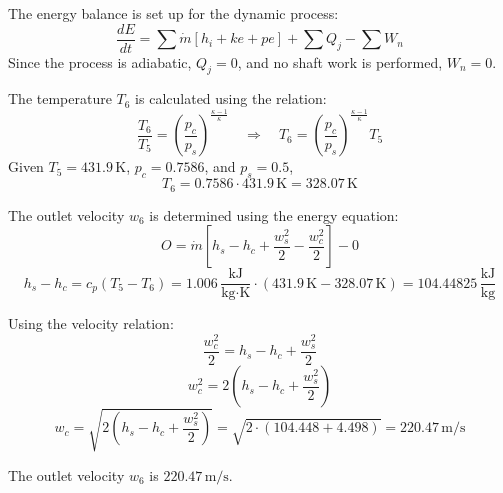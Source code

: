 The energy balance is set up for the dynamic process:  
\[
\frac{dE}{dt} = \sum \dot{m} \left[ h_i + ke + pe \right] + \sum Q_j - \sum W_n
\]  
Since the process is adiabatic, \( Q_j = 0 \), and no shaft work is performed, \( W_n = 0 \).  

The temperature \( T_6 \) is calculated using the relation:  
\[
\frac{T_6}{T_5} = \left( \frac{p_c}{p_s} \right)^{\frac{\kappa - 1}{\kappa}} \quad \Rightarrow \quad T_6 = \left( \frac{p_c}{p_s} \right)^{\frac{\kappa - 1}{\kappa}} T_5
\]  
Given \( T_5 = 431.9 \, \text{K} \), \( p_c = 0.7586 \), and \( p_s = 0.5 \),  
\[
T_6 = 0.7586 \cdot 431.9 \, \text{K} = 328.07 \, \text{K}
\]  

The outlet velocity \( w_6 \) is determined using the energy equation:  
\[
O = \dot{m} \left[ h_s - h_c + \frac{w_s^2}{2} - \frac{w_c^2}{2} \right] - 0
\]  
\[
h_s - h_c = c_p \left( T_5 - T_6 \right) = 1.006 \, \frac{\text{kJ}}{\text{kg·K}} \cdot (431.9 \, \text{K} - 328.07 \, \text{K}) = 104.44825 \, \frac{\text{kJ}}{\text{kg}}
\]  

Using the velocity relation:  
\[
\frac{w_c^2}{2} = h_s - h_c + \frac{w_s^2}{2}
\]  
\[
w_c^2 = 2 \left( h_s - h_c + \frac{w_s^2}{2} \right)
\]  
\[
w_c = \sqrt{2 \left( h_s - h_c + \frac{w_s^2}{2} \right)} = \sqrt{2 \cdot (104.448 + 4.498)} = 220.47 \, \text{m/s}
\]  

The outlet velocity \( w_6 \) is \( 220.47 \, \text{m/s} \).